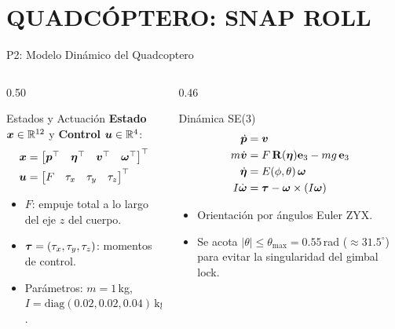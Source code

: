 \section{QUADCÓPTERO: SNAP ROLL}

\begin{frame}{P2: Modelo Dinámico del Quadcoptero}
\begin{columns}[T]
\begin{column}{0.50\textwidth}
\begin{tbox}{Estados y Actuación}
\footnotesize
\textbf{Estado} $\bm{x} \in \mathbb{R}^{12}$ y \textbf{Control} $\bm{u} \in \mathbb{R}^4$:
\begin{align*}
\bm{x} &= \begin{bmatrix}\bm{p}^{\top} & \bm{\eta}^{\top} & \bm{v}^{\top} & \bm{\omega}^{\top}\end{bmatrix}^{\top}\\
\bm{u} &= \begin{bmatrix}F & \tau_x & \tau_y & \tau_z\end{bmatrix}^{\top}
\end{align*}
\begin{itemize}
\item $F$: empuje total a lo largo del eje $z$ del cuerpo.
\item $\bm{\tau} = (\tau_x,\tau_y,\tau_z)$: momentos de control.
\item Parámetros: $m=1$\,kg, $I=\mathrm{diag}(0.02, 0.02, 0.04)\,\text{kg}\cdot\text{m}^2$.
\end{itemize}
\end{tbox}
\end{column}

\begin{column}{0.46\textwidth}
\begin{tbox}{Dinámica SE(3)}
\footnotesize
\begin{align*}
\dot{\bm{p}} &= \bm{v} \\
m\dot{\bm{v}} &= F\,\mathbf{R}(\bm{\eta})\mathbf{e}_3 - mg\,\mathbf{e}_3 \\
\dot{\bm{\eta}} &= E(\phi,\theta)\,\bm{\omega} \\
I\dot{\bm{\omega}} &= \bm{\tau} - \bm{\omega} \times (I\bm{\omega})
\end{align*}
\begin{itemize}
\item Orientación por ángulos Euler ZYX.
\item Se acota $|\theta| \le \theta_{\max} = 0.55$\,rad ($\approx 31.5^\circ$) para evitar la singularidad del gimbal lock.
\end{itemize}
\end{tbox}
\end{column}
\end{columns}
\end{frame}

